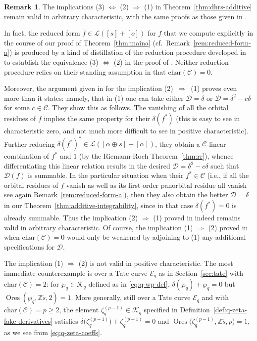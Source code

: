 \documentclass[preprint,12pt]{elsarticle}
\numberwithin{equation}{section} %
\theoremstyle{theorem}
\theoremstyle{definition}
\newtheorem{remark}[theorem]{Remark}
\newcommand{\Ca}{\mathcal{C}} %
\newcommand{\bk}{\mathcal{K}} %
\newcommand{\bkq}{\bk_{q}} %
\newcommand{\ec}{\mathcal{E}} %
\newcommand{\idec}{{o}} %
\newcommand{\ecq}{\ec_{q}}
\newcommand{\Z}{\mathbb{Z}} %
\newcommand{\zq}{\zeta_{q}}
\newcommand{\zqd}[1]{\zq^{({#1})}} %
\DeclareMathOperator{\ores}{Ores}
\begin{document}
\begin{remark}\label{rem:dhrs-additive} The implications (3) $\Leftrightarrow$ (2) $\Rightarrow$ (1) in Theorem~\ref{thm:dhrs-additive} remain valid in arbitrary characteristic, with the same proofs as those given in \cite{Dreyfus2018}.

In fact, the reduced form $\bar{f}\in\mathcal{L}([s]+[\idec])$ for $f$ that we compute explicitly in the course of our proof of Theorem~\ref{thm:maina} (cf.~Remark~\ref{rem:reduced-form-a}) is produced by a kind of distillation of the reduction procedure developed in \cite{Dreyfus2018} to establish the equivalence (3) $\Leftrightarrow$ (2) in the proof of \cite[Prop.~B.8]{Dreyfus2018}. Neither reduction procedure relies on their standing assumption in \cite[Appendix~B]{Dreyfus2018} that $\mathrm{char}(\Ca)=0$.

Moreover, the argument given in \cite[p.~198]{Dreyfus2018} for the implication \mbox{(2) $\Rightarrow$ (1)} proves even more than it states: namely, that in (1) one can take either $\mathcal{D}=\delta$ or $\mathcal{D}=\delta^2-c\delta$ for some $c\in\Ca$. They show this as follows. The vanishing of all the orbital residues of $f$ implies the same property for their $\delta(f^*)$ (this is easy to see in characteristic zero, and not much more difficult to see in positive characteristic). Further reducing $\delta(f^*)^*\in\mathcal{L}([\alpha\oplus s]+[\alpha])$, they obtain a $\Ca$-linear combination of $f^*$ and $1$ (by the Riemann-Roch Theorem~\ref{thm:rr}), whence differentiating this linear relation results in the desired $\mathcal{D}=\delta^2-c\delta$ such that $\mathcal{D}(f)$ is summable. In the particular situation when their $f^*\in\Ca$ (i.e., if all the orbital residues of $f$ vanish as well as its first-order panorbital residue all vanish -- see again Remark~\ref{rem:reduced-form-a}), then they also obtain the better $\mathcal{D}=\delta$ in our Theorem~\ref{thm:additive-integrability}, since in that case $\delta(f^*)=0$ is already summable. Thus the implication (2) $\Rightarrow$ (1) proved in \cite[Prop.~B.5]{Dreyfus2018} indeed remains valid in arbitrary characteristic. Of course, the implication (1) $\Rightarrow$ (2) proved in \cite[Prop.~B.5]{Dreyfus2018} when $\mathrm{char}(\Ca)=0$ would only be weakened by adjoining to (1) any additional specifications for $\mathcal{D}$.


The implication (1) $\Rightarrow$ (2) is not valid in positive characteristic. The most immediate counterexample is over a Tate curve $\ecq$ as in Section~\ref{sec:tate} with $\mathrm{char}(\Ca)=2$: for $\wp_q\in\bkq$ defined as in \eqref{eq:q-wp-def}, $\delta(\wp_q)+\wp_q=0$ but $\ores(\wp_q,\Z\check{s},2)=1$. More generally, still over a Tate curve $\ecq$ and with $\mathrm{char}(\Ca)=p\geq 2$, the element $\zqd{p-1}\in\bkq$ specified in Definition~\ref{def:q-zeta-fake-derivatives} satisfies $\delta\bigl(\zqd{p-1}\bigr)+\zqd{p-1}=0$ and $\ores\bigl(\zqd{p-1},\Z\check{s},p\bigr)=1$, as we see from \eqref{eq:q-zeta-coeffs}.


\end{remark}
\end{document}
